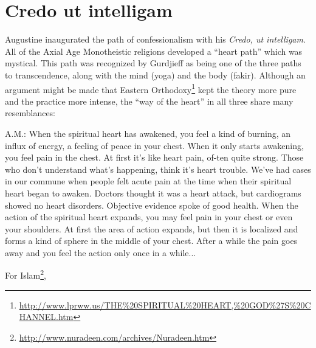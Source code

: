 \section{Credo ut intelligam}

Augustine inaugurated the path of confessionalism with his \emph{Credo, ut intelligam}. All of the Axial Age Monotheistic religions developed a ``heart path'' which was mystical. This path was recognized by Gurdjieff as being one of the three paths to transcendence, along with the mind (yoga) and the body (fakir). Although an argument might be made that Eastern Orthodoxy\footnote{\url{http://www.lprww.us/THE\%20SPIRITUAL\%20HEART,\%20GOD\%27S\%20CHANNEL.htm}} kept the theory more pure and the practice more intense, the ``way of the heart'' in all three share many resemblances:

\begin{quotex}
A.M.: When the spiritual heart has awakened, you feel a kind of burning, an influx of energy, a feeling of peace in your chest. When it only starts awakening, you feel pain in the chest. At first it's like heart pain, of-ten quite strong. Those who don't understand what's happening, think it's heart trouble. We've had cases in our commune when people felt acute pain at the time when their spiritual heart began to awaken. Doctors thought it was a heart attack, but cardiograms showed no heart disorders. Objective evidence spoke of good health. When the action of the spiritual heart expands, you may feel pain in your chest or even your shoulders. At first the area of action expands, but then it is localized and forms a kind of sphere in the middle of your chest. After a while the pain goes away and you feel the action only once in a while... 
\end{quotex}


For Islam\footnote{\url{http://www.nuradeen.com/archives/Nuradeen.htm}},

